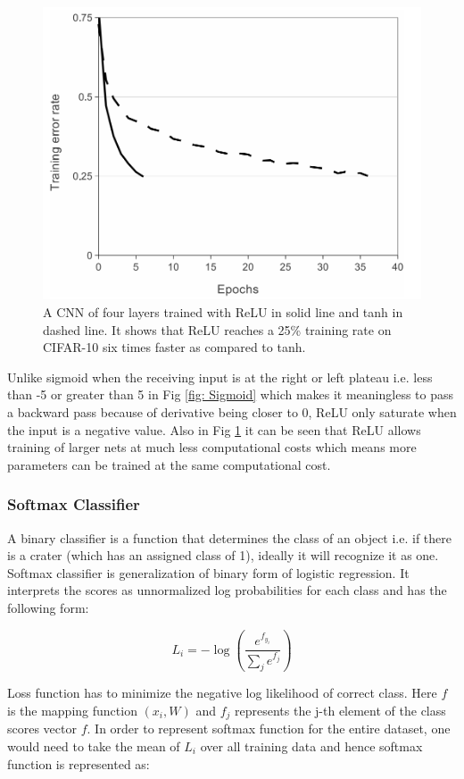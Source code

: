 \documentclass[11pt]{article}
\begin{document}
\begin{figure}[ht!]
	\centering
	\includegraphics[width=.6\linewidth]{files/cnn_architecture/relu_fast.png}
	\caption{A CNN of four layers trained with ReLU in solid line and tanh in dashed line. It shows that ReLU reaches a 25\% training rate on CIFAR-10 six times faster as compared to tanh.}
	\label{fig: relu_fast}
\end{figure}

Unlike sigmoid when the receiving input is at the right or left plateau i.e. less than -5 or greater than 5 in Fig \ref{fig: Sigmoid} which makes it meaningless to pass a backward pass because of derivative being closer to 0, ReLU only saturate when the input is a negative value. Also in Fig \ref{fig: relu_fast} \cite{krizhevsky2012imagenet} it can be seen that ReLU allows training of larger nets at much less computational costs which means more parameters can be trained at the same computational cost.

\subsubsection{Softmax Classifier}
A binary classifier is a function that determines the class of an object i.e. if there is a crater (which has an assigned class of 1), ideally it will recognize it as one. Softmax classifier is generalization of binary form of logistic regression. It interprets the scores as unnormalized log probabilities for each class and has the following form:

\begin{equation}
\label{singlesoftmax}
L_i = -\log\left(\frac{e^{f_{y_i}}}{ \sum_j e^{f_j} }\right) 
\end{equation}

Loss function has to minimize the negative log likelihood of correct class. Here $f$ is the mapping function $(x_i,W)$ and $f_j$ represents the j-th element of the class scores vector $f$. In order to represent softmax function for the entire dataset, one would need to take the mean of $L_i$ over all training data and hence softmax function is represented as:
\end{document}
